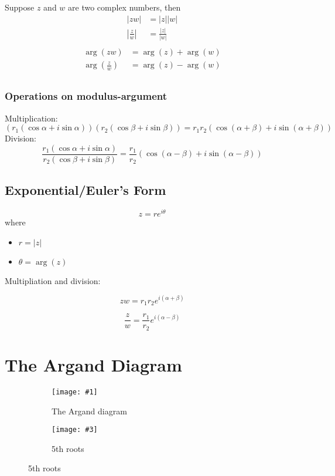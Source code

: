 \documentclass[11pt]{article}
\newcommand{\doubleimg}[4]{\begin{center}
  \begin{figure}[H]
    \centering
    \begin{subfigure}{.45\textwidth}
      \centering
      \texttt{[image: \#1]}
      \caption{#2}
      \label{fig:sub1}
    \end{subfigure}
    \begin{subfigure}{.45\textwidth}
      \centering
      \texttt{[image: \#3]}
      \caption{#4}
      \label{fig:sub2}
    \end{subfigure}
  \end{figure}
\end{center}}
\begin{document}
Suppose $z$ and $w$ are two complex numbers, then
\begin{align*}
  |zw|          & = |z||w|          \\
  |\frac{z}{w}| & = \frac{|z|}{|w|} \\
\end{align*}
\begin{align*}
  \arg(zw)          & = \arg(z) + \arg(w) \\
  \arg(\frac{z}{w}) & = \arg(z) - \arg(w) \\
\end{align*}

\subsubsection*{Operations on modulus-argument}
Multiplication:
$$\left(r_1(\cos \alpha + i\sin\alpha)\right)\left(r_2(\cos \beta + i\sin\beta)\right) = r_1r_2\left(\cos(\alpha + \beta) + i\sin(\alpha + \beta)\right)$$
Division:
$$\frac{r_1\left(\cos\alpha + i\sin\alpha\right)}{r_2\left(\cos \beta + i\sin\beta\right)} = \frac{r_1}{r_2}\left(\cos(\alpha - \beta) + i\sin(\alpha - \beta)\right)$$

\pagebreak

\subsection{Exponential/Euler's Form}

$$z = re^{i\theta}$$
where
\begin{itemize}
  \item $r = |z|$
  \item $\theta = \arg(z)$
\end{itemize}

\noindent Multipliation and division:

$$zw = r_1r_2e^{i(\alpha + \beta)}$$

$$\frac{z}{w} = \frac{r_1}{r_2}e^{i(\alpha - \beta)}$$

\pagebreak

\section{The Argand Diagram}

\doubleimg{figs/1.png}{The Argand diagram}{figs/roots.jpeg}{5th roots}
\end{document}
